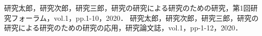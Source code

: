 \documentclass[a4paper,11pt,uplatex]{ujreport}
\begin{document}
\renewcommand{\bibname}{研究業績}

\begin{thebibliography}{99}
  \bibitem{} 研究太郎，研究次郎，研究三郎，研究の研究による研究のための研究，第1回研究フォーラム，vol.1，pp.1-10，2020．
  \bibitem{} 研究太郎，研究次郎，研究三郎，研究の研究による研究のための研究の応用，研究論文誌，vol.1，pp-1-12，2020．
\end{thebibliography}

\label{chap:Publications}

\end{document}
